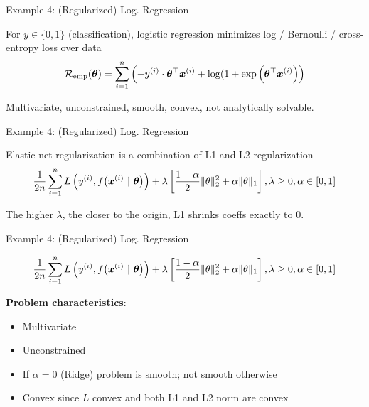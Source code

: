 \documentclass[11pt,compress,t,notes=noshow, xcolor=table]{beamer}
\begin{document}

\begin{framei}{Example 4: (Regularized) Log. Regression}
\item For $y \in \{0, 1\}$ (classification), logistic regression minimizes log / Bernoulli / cross-entropy loss over data
$$ \mathcal{R}_{\text{emp}}(\bm{\theta}) = \sum\limits_{i=1}^n \left(-y^{(i)} \cdot \bm{\theta}^\top\bm{x}^{(i)} + \log(1 + \exp\left(\bm{\theta}^\top\bm{x}^{(i)}\right)\right) $$
\item Multivariate, unconstrained, smooth, convex, not analytically solvable.
\vfill
{}
\end{framei}


\begin{framei}[fs=footnotesize]{Example 4: (Regularized) Log. Regression}
\item Elastic net regularization is a combination of L1 and L2 regularization
$$ \frac{1}{2n} \sum\limits_{i=1}^n L\left(y^{(i)}, f\big(\bm{x}^{(i)} ~|~ \bm{\theta}\big)\right) + \lambda \left[\frac{1-\alpha}{2}\|\theta\|^{2}_{2} + \alpha\|\theta\|_{1}\right], \lambda \geq 0, \alpha \in [0,1] $$
\vfill
{}
\item The higher $\lambda$, the closer to the origin, L1 shrinks coeffs exactly to 0.
\end{framei}


\begin{framei}{Example 4: (Regularized) Log. Regression}
\item[] $$ \frac{1}{2n} \sum\limits_{i=1}^n L\left(y^{(i)}, f\big(\bm{x}^{(i)} ~|~ \bm{\theta}\big)\right) + \lambda \left[\frac{1-\alpha}{2}\|\theta\|^{2}_{2} + \alpha\|\theta\|_{1}\right], \lambda \geq 0, \alpha \in [0,1] $$
\spacer
\item \textbf{Problem characteristics}:
\begin{itemize}
\item Multivariate
\item Unconstrained
\item If $\alpha = 0$ (Ridge) problem is smooth; not smooth otherwise
\item Convex since $L$ convex and both L1 and L2 norm are convex
\end{itemize}
\end{framei}
\end{document}
